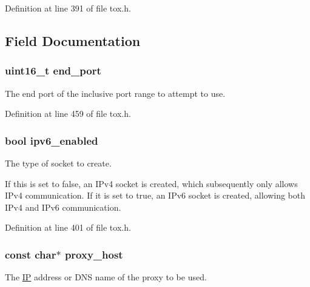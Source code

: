 Definition at line 391 of file tox.\+h.



\subsection{Field Documentation}
\hypertarget{struct_tox___options_a72adaef23252363613b9ace5351ce521}{
\subsubsection[{end\+\_\+port}]{\setlength{\rightskip}{0pt plus 5cm}uint16\+\_\+t end\+\_\+port}}\label{struct_tox___options_a72adaef23252363613b9ace5351ce521}
The end port of the inclusive port range to attempt to use. 

Definition at line 459 of file tox.\+h.

\hypertarget{struct_tox___options_a320e68fce8ebf1b6f0bb10494d800441}{
\subsubsection[{ipv6\+\_\+enabled}]{\setlength{\rightskip}{0pt plus 5cm}bool ipv6\+\_\+enabled}}\label{struct_tox___options_a320e68fce8ebf1b6f0bb10494d800441}
The type of socket to create.

If this is set to false, an I\+Pv4 socket is created, which subsequently only allows I\+Pv4 communication. If it is set to true, an I\+Pv6 socket is created, allowing both I\+Pv4 and I\+Pv6 communication. 

Definition at line 401 of file tox.\+h.

\hypertarget{struct_tox___options_af7c34966a1703e0a031ce2674420c7cf}{
\subsubsection[{proxy\+\_\+host}]{\setlength{\rightskip}{0pt plus 5cm}const char$\ast$ proxy\+\_\+host}}\label{struct_tox___options_af7c34966a1703e0a031ce2674420c7cf}
The \hyperlink{struct_i_p}{I\+P} address or D\+N\+S name of the proxy to be used.

